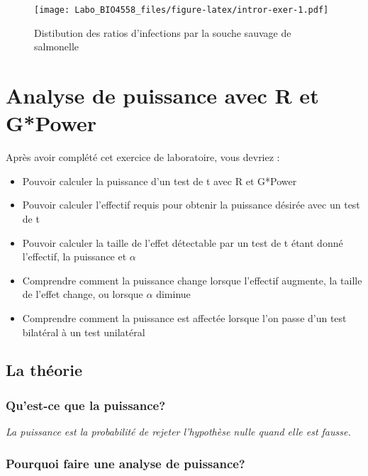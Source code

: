 \documentclass[
  12pt,
]{book}
\providecommand{\tightlist}{%
  \setlength{\itemsep}{0pt}\setlength{\parskip}{0pt}}
\begin{document}
\begin{figure}
\centering
\texttt{[image: Labo\_BIO4558\_files/figure-latex/intror-exer-1.pdf]}
\caption{\label{fig:intror-exer}Distibution des ratios d'infections par la souche sauvage de salmonelle}
\end{figure}

\hypertarget{analyse-de-puissance-avec-r-et-gpower}{%
\chapter{Analyse de puissance avec R et G*Power}\label{analyse-de-puissance-avec-r-et-gpower}}

Après avoir complété cet exercice de laboratoire, vous devriez :

\begin{itemize}
\tightlist
\item
  Pouvoir calculer la puissance d'un test de t avec R et G*Power
\item
  Pouvoir calculer l'effectif requis pour obtenir la puissance désirée avec un test de t
\item
  Pouvoir calculer la taille de l'effet détectable par un test de t étant donné l'effectif, la puissance et \(\alpha\)
\item
  Comprendre comment la puissance change lorsque l'effectif augmente, la taille de l'effet change, ou lorsque \(\alpha\) diminue
\item
  Comprendre comment la puissance est affectée lorsque l'on passe d'un test bilatéral à un test unilatéral
\end{itemize}

\hypertarget{la-thuxe9orie}{%
\section{La théorie}\label{la-thuxe9orie}}

\hypertarget{quest-ce-que-la-puissance}{%
\subsection{Qu'est-ce que la puissance?}\label{quest-ce-que-la-puissance}}

\emph{La puissance est la probabilité de rejeter l'hypothèse nulle quand elle est fausse.}

\hypertarget{pourquoi-faire-une-analyse-de-puissance}{%
\subsection{Pourquoi faire une analyse de puissance?}\label{pourquoi-faire-une-analyse-de-puissance}}
\end{document}

